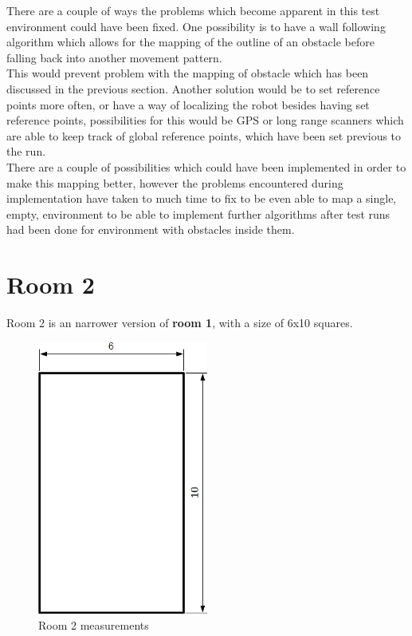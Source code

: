 There are a couple of ways the problems which become apparent in this test environment could have been fixed. One possibility is to have a wall following algorithm which allows for the mapping of the outline of an obstacle before falling back into another movement pattern. \\
This would prevent problem with the mapping of obstacle which has been discussed in the previous section. Another solution would be to set reference points more often, or have a way of localizing the robot besides having set reference points, possibilities for this would be GPS or long range scanners which are able to keep track of global reference points, which have been set previous to the run.\\
There are a couple of possibilities which could have been implemented in order to make this mapping better, however the problems encountered during implementation have taken to much time to fix to be even able to map a single, empty, environment to be able to implement further algorithms after test runs had been done for environment with obstacles inside them.

\section{Room 2}
Room 2 is an narrower version of \textbf{room 1}, with a size of 6x10 squares.

\begin{figure}[h]
\centering
\includegraphics[width = 0.5\textwidth]{../../figures/room2_empty.png} 
\caption{Room 2 measurements}
\label{room2_empty}
\end{figure}

